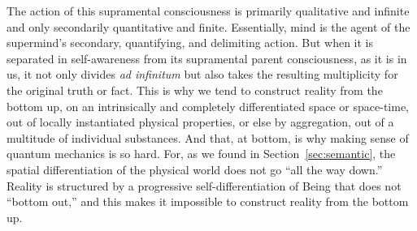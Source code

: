 The action of this supramental consciousness is primarily qualitative and infinite and only secondarily quantitative and finite. Essentially, mind is the agent of the supermind's secondary, quantifying, and delimiting action. But when it is separated in self-awareness from its supramental parent consciousness, as it is in us, it not only divides \emph{ad infinitum} but also takes the resulting multiplicity for the original truth or fact. This is why we tend to construct reality from the bottom up, on an intrinsically and completely differentiated space or space-time, out of locally instantiated physical properties, or else by aggregation, out of a multitude of individual substances. And that, at bottom, is why making sense of quantum mechanics is so hard. For, as we found in Section~\ref{sec:semantic}, the spatial differentiation of the physical world does not go ``all the way down.'' Reality is structured by a progressive self-differentiation of Being that does not ``bottom out,'' and this makes it impossible to construct reality from the bottom up.

